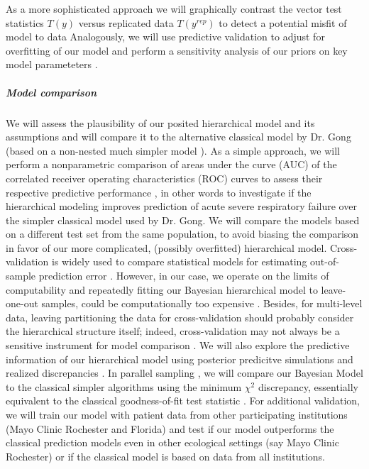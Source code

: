 \documentclass[11pt,notitlepage]{article}
\begin{document}
As a more sophisticated approach we will graphically contrast the vector test statistics $T(y)$ versus replicated data $T(y^{rep})$ to detect a potential misfit of model to data \cite{Gelman2004posteriorpredictivechecks,Buja1999inference} Analogously, we will use predictive validation to adjust for overfitting of our model and perform a sensitivity analysis of our priors on key model parameteters \cite{Gelman-Hill_2014,Gelman_predictive_2000}.

\subparagraph*{Model comparison}
We will assess the plausibility of our posited hierarchical model and its assumptions \cite{Gelman_predictive_2000,GelmanMengStern1996} and will compare it to the alternative classical model by Dr. Gong (based on a non-nested much simpler model \cite{Herridge_12594312}). As a simple approach, we will perform a nonparametric comparison of areas under the curve (AUC) of the correlated receiver operating characteristics (ROC) curves \cite{DeLong_3203132} to assess their respective predictive performance \cite{Newcombe_22890972,Wu_20473190}, in other words to investigate if the hierarchical modeling improves prediction of acute severe respiratory failure over the simpler classical model used by Dr. Gong. We will compare the models based on a different test set from the same population, to avoid biasing the comparison in favor of our more complicated, (possibly overfitted) hierarchical model. Cross-validation is widely used to compare statistical models for estimating out-of-sample prediction error \cite{Vehtari_12396570}. However, in our case, we operate on the limits of computability and repeatedly fitting our Bayesian hierarchical model to leave-one-out samples, could be computationally too expensive \cite{Gelman_Aki_2014predictive}. Besides, for multi-level data, leaving partitioning the data for cross-validation should probably consider the hierarchical structure itself; indeed, cross-validation may not always be a sensitive instrument for model comparison \cite{wang_predictive_2014}. We will also explore the predictive information of our hierarchical model using posterior predicitve simulations and realized discrepancies \cite{Gelman_Aki_2014predictive,Gelman_predictive_2000,GelmanMengStern1996}. In parallel sampling \cite{Congdon_modelcomparison_2005}, we will compare our Bayesian Model to the classical simpler algorithms using the minimum $\chi^{2}$ discrepancy, essentially equivalent to the classical goodness-of-fit test statistic \cite{GelmanMengStern1996}. For additional validation, we will train our model with patient data from other participating institutions (Mayo Clinic Rochester and Florida) and test if our model outperforms the classical prediction models even in other ecological settings (say Mayo Clinic Rochester) or if the classical model is based on data from all institutions.
\end{document}
